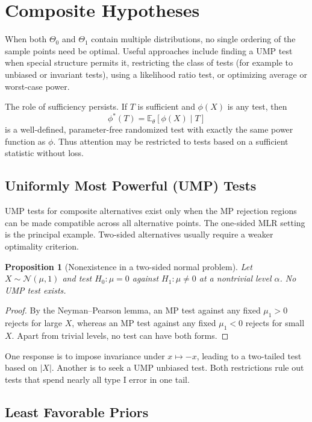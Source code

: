 \documentclass[12pt,oneside]{book}
\numberwithin{equation}{section}
\theoremstyle{definition}
\theoremstyle{plain}
\newtheorem{proposition}{Proposition}[section]
\theoremstyle{remark}
\newcommand{\E}{\mathbb{E}}
\newcommand{\abs}[1]{\left\lvert #1 \right\rvert}
\newcommand{\Normal}{\mathcal{N}}
\begin{document}
\section{Composite Hypotheses}

When both $\Theta_0$ and $\Theta_1$ contain multiple distributions, no single
ordering of the sample points need be optimal.  Useful approaches include
finding a UMP test when special structure permits it, restricting the class
of tests (for example to unbiased or invariant tests), using a likelihood
ratio test, or optimizing average or worst-case power.

The role of sufficiency persists.  If $T$ is sufficient and $\phi(X)$ is any
test, then
\[
    \phi^*(T)=\E_\theta[\phi(X)\mid T]
\]
is a well-defined, parameter-free randomized test with exactly the same power
function as $\phi$.  Thus attention may be restricted to tests based on a
sufficient statistic without loss.

\subsection{Uniformly Most Powerful (UMP) Tests}

UMP tests for composite alternatives exist only when the MP rejection regions
can be made compatible across all alternative points.  The one-sided MLR
setting is the principal example.  Two-sided alternatives usually require a
weaker optimality criterion.

\begin{proposition}[Nonexistence in a two-sided normal problem]
Let $X\sim\Normal(\mu,1)$ and test $H_0:\mu=0$ against $H_1:\mu\neq0$ at a
nontrivial level $\alpha$.  No UMP test exists.
\end{proposition}

\begin{proof}
By the Neyman--Pearson lemma, an MP test against any fixed $\mu_1>0$ rejects
for large $X$, whereas an MP test against any fixed $\mu_1<0$ rejects for
small $X$.  Apart from trivial levels, no test can have both forms.
\end{proof}

One response is to impose invariance under $x\mapsto-x$, leading to a
two-tailed test based on $\abs X$.  Another is to seek a UMP unbiased test.
Both restrictions rule out tests that spend nearly all type I error in one
tail.

\subsection{Least Favorable Priors}
\end{document}
